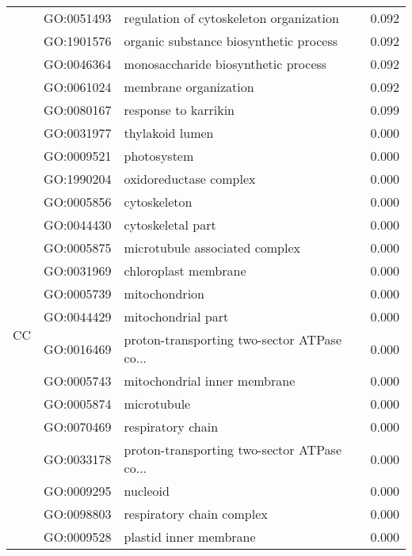 \begin{longtable}{lllr}
   & GO:0051493 &      regulation of cytoskeleton organization &         0.092 \\
   & GO:1901576 &       organic substance biosynthetic process &         0.092 \\
   & GO:0046364 &          monosaccharide biosynthetic process &         0.092 \\
   & GO:0061024 &                        membrane organization &         0.092 \\
   & GO:0080167 &                         response to karrikin &         0.099 \\
\cline{1-4}
\multirow{45}{*}{CC} & GO:0031977 &                              thylakoid lumen &         0.000 \\
   & GO:0009521 &                                  photosystem &         0.000 \\
   & GO:1990204 &                       oxidoreductase complex &         0.000 \\
   & GO:0005856 &                                 cytoskeleton &         0.000 \\
   & GO:0044430 &                            cytoskeletal part &         0.000 \\
   & GO:0005875 &               microtubule associated complex &         0.000 \\
   & GO:0031969 &                         chloroplast membrane &         0.000 \\
   & GO:0005739 &                                mitochondrion &         0.000 \\
   & GO:0044429 &                           mitochondrial part &         0.000 \\
   & GO:0016469 &  proton-transporting two-sector ATPase co... &         0.000 \\
   & GO:0005743 &                 mitochondrial inner membrane &         0.000 \\
   & GO:0005874 &                                  microtubule &         0.000 \\
   & GO:0070469 &                            respiratory chain &         0.000 \\
   & GO:0033178 &  proton-transporting two-sector ATPase co... &         0.000 \\
   & GO:0009295 &                                     nucleoid &         0.000 \\
   & GO:0098803 &                    respiratory chain complex &         0.000 \\
   & GO:0009528 &                       plastid inner membrane &         0.000 \\

\end{longtable}
